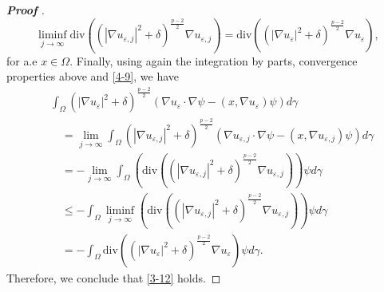 \documentclass[12pt]{amsart}
\newcommand{\1}{\mathbf 1}
\begin{document}
\begin{proof}[\bf Proof ]
\[
\mathop{\lim \inf }_{j\rightarrow \infty} \mathrm{div} ((|\nabla u_{\varepsilon,j}|^2+\delta)^{\frac{p-2}{2}} \nabla u_{\varepsilon,j})=\mathrm{div} \left((|\nabla u_\varepsilon|^2+\delta)^{\frac{p-2}{2}} \nabla u_\varepsilon\right) ,
\]
for a.e $x\in \Omega$. Finally, using again the integration by parts, convergence properties above and \eqref{4-9}, we have
\begin{align*}
&\int_\Omega (|\nabla u_\varepsilon|^2+\delta)^{\frac{p-2}{2}}( \nabla u_\varepsilon \cdot \nabla \psi -(x,\nabla u_{\varepsilon}) \psi )d\gamma \\
&\quad=\mathop{\lim }_{j\rightarrow \infty} \int_{\Omega}  (|\nabla u_{\varepsilon,j}|^2+\delta)^{\frac{p-2}{2}} (\nabla u_{\varepsilon,j} \cdot \nabla\psi  -(x,\nabla u_{\varepsilon,j}) \psi) d\gamma\\
&\quad =-\mathop{\lim }_{j\rightarrow \infty} \int_{\Omega} \left(\mathrm{div} ((|\nabla u_{\varepsilon,j}|^2+\delta)^{\frac{p-2}{2}} \nabla u_{\varepsilon,j}) \right) \psi d\gamma\\
&\quad\leq - \int_{\Omega}\mathop{\lim \inf}_{j\rightarrow \infty} \left(\mathrm{div} ((|\nabla u_{\varepsilon,j}|^2+\delta)^{\frac{p-2}{2}} \nabla u_{\varepsilon,j}) \right) \psi d\gamma\\
&\quad =-\int_\Omega \mathrm{div} \left((|\nabla u_\varepsilon|^2+\delta)^{\frac{p-2}{2}} \nabla u_\varepsilon\right) \psi d\gamma.
\end{align*}
Therefore, we conclude that \eqref{3-12} holds.


\end{proof}
\end{document}
